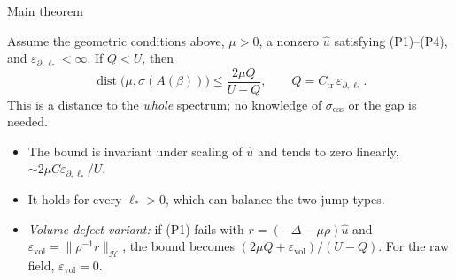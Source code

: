 \documentclass[aspectratio=169]{beamer}
\newcommand{\eps}{\varepsilon_{\partial,\ell_*}}
\newcommand{\dist}{\operatorname{dist}}
\begin{document}
\begin{frame}{Main theorem}
  \begin{theorem}
    Assume the geometric conditions above, $\mu>0$, a nonzero $\widehat u$ satisfying
    (P1)--(P4), and $\eps<\infty$. If $Q<U$, then
    \[
      \boxed{\ \dist\bigl(\mu,\sigma(A(\beta))\bigr)\le\frac{2\mu Q}{U-Q},\qquad Q=C_{\mathrm{tr}}\,\eps.\ }
    \]
    This is a distance to the \emph{whole} spectrum; no knowledge of
    $\sigma_{\mathrm{ess}}$ or the gap is needed.
  \end{theorem}
  \small
  \begin{itemize}
    \item The bound is invariant under scaling of $\widehat u$ and tends to zero linearly,
      $\sim2\mu C\eps/U$.
    \item It holds for every $\ell_*>0$, which can balance the two jump types.
    \item \emph{Volume defect variant:} if (P1) fails with
      $r=(-\Delta-\mu\rho)\widehat u$ and
      $\varepsilon_{\mathrm{vol}}=\lVert\rho^{-1}r\rVert_{\mathcal H}$, the bound becomes
      $(2\mu Q+\varepsilon_{\mathrm{vol}})/(U-Q)$. For the raw field,
      $\varepsilon_{\mathrm{vol}}=0$.
  \end{itemize}
\end{frame}
\end{document}
